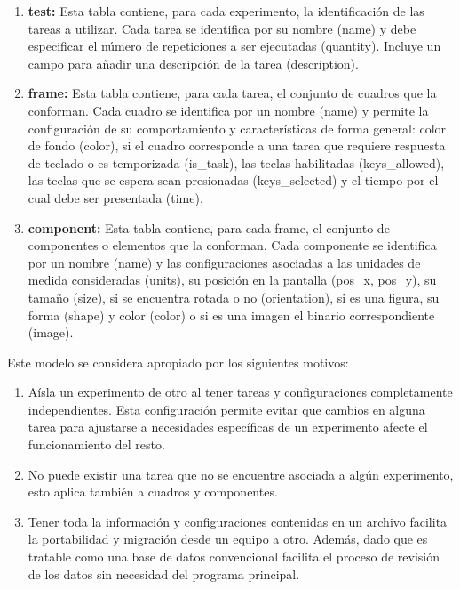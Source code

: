 \documentclass[\main/main.tex]{subfiles}
\begin{document}
\begin{enumerate}
			\item \textbf{test:} Esta tabla contiene, para cada experimento, la identificación de las tareas a utilizar. Cada tarea se identifica por su nombre (name) y debe especificar el número de repeticiones a ser ejecutadas (quantity). Incluye un campo para añadir una descripción de la tarea (description).

			\item \textbf{frame:} Esta tabla contiene, para cada tarea, el conjunto de cuadros que la conforman. Cada cuadro se identifica por un nombre (name) y permite la configuración de su comportamiento y características de forma general: color de fondo (color), si el cuadro corresponde a una tarea que requiere respuesta de teclado o es temporizada (is\_task), las teclas habilitadas (keys\_allowed), las teclas que se espera sean presionadas (keys\_selected) y el tiempo por el cual debe ser presentada (time).

			\item \textbf{component:} Esta tabla contiene, para cada frame, el conjunto de componentes o elementos que la conforman. Cada componente se identifica por un nombre (name) y las configuraciones asociadas a las unidades de medida consideradas (units), su posición en la pantalla (pos\_x, pos\_y), su tamaño (size), si se encuentra rotada o no (orientation), si es una figura, su forma (shape) y color (color) o si es una imagen el binario correspondiente (image). 
		\end{enumerate}

		Este modelo se considera apropiado por los siguientes motivos:
		\begin{enumerate}
			\item Aísla un experimento de otro al tener tareas y configuraciones completamente independientes. Esta configuración permite evitar que cambios en alguna tarea para ajustarse a necesidades específicas de un experimento afecte el funcionamiento del resto.

			\item No puede existir una tarea que no se encuentre asociada a algún experimento, esto aplica también a cuadros y componentes. 

			\item Tener toda la información y configuraciones contenidas en un archivo facilita la portabilidad y migración desde un equipo a otro. Además, dado que es tratable como una base de datos convencional facilita el proceso de revisión de los datos sin necesidad del programa principal.
		\end{enumerate}
\end{document}
